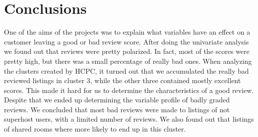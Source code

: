 

\section{Conclusions}%
\label{sec:conclusions}

One of the aims of the projects was to explain what variables have an effect on a customer leaving a good or bad review score. After doing the univariate analysis we found out that reviews were pretty polarized.  In fact, most of the scores were pretty high, but there was a small percentage of really bad ones. When analyzing the clusters created by HCPC, it turned out that we accumulated the really bad reviewed listings in cluster 3, while the other three contained mostly excellent scores. This made it hard for us to determine the characteristics of a good review. Despite that we ended up determining the variable profile of badly graded reviews. We concluded that most bad reviews were made to listings of not superhost users, with a limited number of reviews. We also found out that listings of shared rooms where more likely to end up in this cluster.

